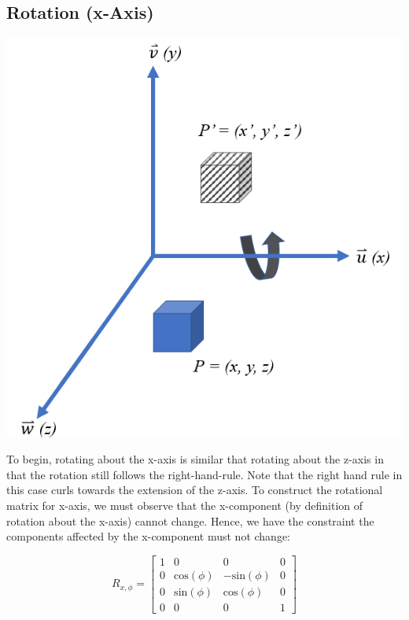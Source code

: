 \documentclass[12pt,letterpaper]{article}
\begin{document}
\subsection{Rotation (x-Axis)}
\begin{center}
\includegraphics[scale=0.75]{xRotation}
\end{center}

To begin, rotating about the x-axis is similar that rotating about the z-axis in that the rotation still follows the right-hand-rule. Note that the right hand rule in this case curls towards the extension of the z-axis. To construct the rotational matrix for x-axis, we must observe that the x-component (by definition of rotation about the x-axis) cannot change. Hence, we have the constraint the components affected by the x-component must not change:

\begin{equation}
    R_{x, \phi} = \begin{bmatrix}
        1 & 0 & 0 & 0 \\
        0 & \text{cos}(\phi) & -\text{sin}(\phi) & 0 \\
        0 & \text{sin}(\phi) &  \text{cos}(\phi) & 0 \\
        0 & 0 & 0 & 1
    \end{bmatrix}
\end{equation}
\end{document}
